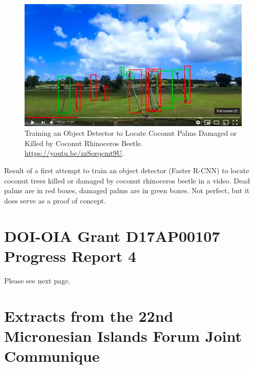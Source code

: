 \documentclass[12pt,letterpaper,english,bibliography=totocnumbered, abstract=on]{scrartcl}
\begin{document}
\begin{appendices}
\begin{figure}[h]
\centering
\includegraphics[width=0.7\linewidth]{images/royal-palms}
\caption{Training an Object Detector to Locate Coconut Palms Damaged or Killed by Coconut Rhinoceros Beetle. \url{https://youtu.be/zzSorqcmt9U}.}
\label{fig:royal-palms}
\end{figure}

Result of a first attempt to train an object detector (Faster R-CNN) to locate coconut trees killed or damaged by coconut rhinoceros beetle in a video. Dead palms are in red boxes, damaged palms are in green boxes. Not perfect, but it does serve as a proof of concept.

\clearpage

%

\section{DOI-OIA Grant D17AP00107 Progress Report 4}
\label{section report4}
Please see next page.


%

\section{\label{sec:Extracts-from-the}Extracts from the 22nd Micronesian
Islands Forum Joint Communique}



\end{appendices}
\end{document}
